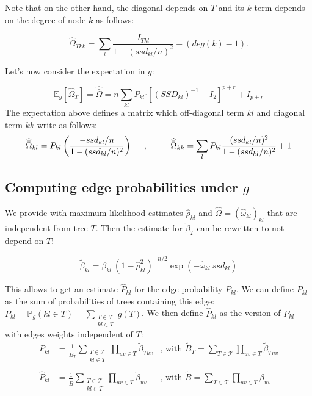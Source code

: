\documentclass[11pt,a4paper]{article}
\newcommand{\Esp}{\mathds{E}}
\newcommand{\had}{\boldsymbol{\cdot}}
\begin{document}
 Note that on the other hand, the diagonal depends on $T$ and its $k$ term depends on the degree of node $k$ as follows:

$$\widehat{\Omega}_{Tkk} =\sum_l \frac{I_{Tkl} }{1-(ssd_{kl}/n)^2} -(deg(k)-1).$$
 
Let's now consider the expectation in $g$:

$$\Esp_g[\widehat{\Omega}_T]= \widehat{\bar{\Omega}}= n\sum_{kl} P_{kl} \had [(SSD_{kl})^{-1} - I_2]^{p+r} + I_{p+r}$$
 The expectation above defines a matrix which off-diagonal term $kl$ and diagonal term $kk$ write as follows:
$$\widehat{\bar{\Omega}}_{kl} = P_{kl} \left(\frac{-ssd_{kl}/n}{1-(ssd_{kl}/n)^2} \right)\text{\hspace{0.5cm},\hspace{1cm}}\widehat{\bar{\Omega}}_{kk} = \sum_l P_{kl} \frac{(ssd_{kl}/n)^2}{1-(ssd_{kl}/n)^2} +1 $$
 
 \subsection{Computing edge probabilities under $g$}
We  provide with maximum likelihood estimates $\hat{\rho}_{kl}$ and $\widehat{\Omega}=(\hat{\omega}_{kl})_{kl}$ that are independent from tree $T$. Then the estimate for $\widetilde{\beta}_{T}$ can be rewritten to not depend on $T$:

   $$ \displaystyle \widetilde{\beta}_{kl} = \beta_{kl} \: (1-\hat{\rho}_{kl}^2)^{-n/2} \exp( -\hat{\omega}_{kl}\: ssd_{kl} ) $$
 
This allows to get an estimate $\hat{P}_{kl}$ for the edge probability $P_{kl}$. We can define $P_{kl}$ as the sum of probabilities of trees containing this edge: $P_{kl}=\mathds{P}_g(kl \in T)  = \sum_{\substack{T  \in \mathcal{T} \\ kl \in T }} g(T) $. We then define  $\hat{P}_{kl}$ as the version of $P_{kl}$ with edges weights independent of $T$:
\[
\begin{array}{ccl}
 P_{kl}& =\displaystyle\frac{1}{\widetilde{B}_T} \sum_{\substack{T  \in \mathcal{T} \\ kl \in T }} \prod_{uv \in T} \widetilde{\beta}_{Tuv} & \text{, with }\widetilde{B}_T= \sum_{T \in \mathcal{T} }\prod_{uv \in T}  \widetilde{\beta}_{Tuv}\\\\
\hat{P}_{kl} &=\displaystyle \frac{1}{\widetilde{B}} \sum_{\substack{T  \in \mathcal{T} \\ kl \in T }} \prod_{uv \in T} \widetilde{\beta}_{uv} &\text{, with } \widetilde{B}= \sum_{T \in \mathcal{T} }\prod_{uv \in T}  \widetilde{\beta}_{uv}
\end{array}\]
 
\end{document}
